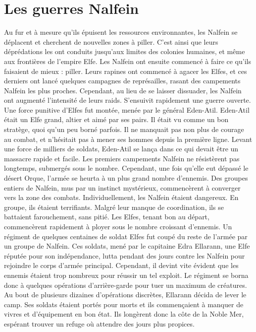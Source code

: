 \section{Les guerres Nalfein}
Au fur et à mesure qu'ils épuisent les ressources environnantes, les Nalfein se déplacent et cherchent de nouvelles zones à piller. C'est ainsi que leurs déprédations les ont conduits jusqu'aux limites des colonies humaines, et même aux frontières de l'empire Elfe. Les Nalfein ont ensuite commencé à faire ce qu'ils faisaient de mieux : piller. Leurs rapines ont commencé à agacer les Elfes, et ces derniers ont lancé quelques campagnes de représailles, rasant des campements Nalfein les plus proches. Cependant, au lieu de se laisser dissuader, les Nalfein ont augmenté l'intensité de leurs raids. S'ensuivit rapidement une guerre ouverte. Une force punitive d'Elfes fut montée, menée par le général Eden-Atil. 
\newline
Eden-Atil était un Elfe grand, altier et aimé par ses pairs. Il était vu comme un bon stratège, quoi qu'un peu borné parfois. Il ne manquait pas non plus de courage au combat, et n'hésitait pas à mener ses hommes depuis la première ligne. Levant une force de milliers de soldats, Eden-Atil se lança dans ce qui devait être un massacre rapide et facile. Les premiers campements Nalfein ne résistèrent pas longtemps, submergés sous le nombre. Cependant, une fois qu'elle eut dépassé le désert Orque, l'armée se heurta à un plus grand nombre d'ennemis. Des groupes entiers de Nalfein, mus par un instinct mystérieux, commencèrent à converger vers la zone des combats. Individuellement, les Nalfein étaient dangereux. En groupe, ils étaient terrifiants. Malgré leur manque de coordination, ils se battaient farouchement, sans pitié. Les Elfes, tenant bon au départ, commencèrent rapidement à ployer sous le nombre croissant d'ennemis. Un régiment de quelques centaines de soldat Elfes fut coupé du reste de l'armée par un groupe de Nalfein. Ces soldats, mené par le capitaine Edra Ellarann, une Elfe réputée pour son indépendance, lutta pendant des jours contre les Nalfein pour rejoindre le corps d'armée principal. Cependant, il devint vite évident que les ennemis étaient trop nombreux pour réussir un tel exploit. Le régiment se borna donc à quelques opérations d'arrière-garde pour tuer un maximum de créatures. Au bout de plusieurs dizaines d'opérations discrètes, Ellarann décida de lever le camp. Ses soldats étaient portés pour morts et ils commençaient à manquer de vivres et d'équipement en bon état. Ils longèrent donc la côte de la Noble Mer, espérant trouver un refuge où attendre des jours plus propices.
